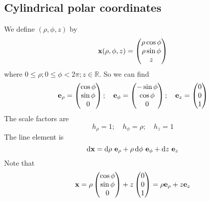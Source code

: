 \subsection{Cylindrical polar coordinates}
We define \((\rho, \phi, z)\) by
\[
	\vb x(\rho, \phi, z) = \begin{pmatrix}
		\rho \cos \phi \\
		\rho \sin \phi \\
		z
	\end{pmatrix}
\]
where \(0 \leq \rho; 0 \leq \phi < 2 \pi; z \in \mathbb R\).
So we can find
\[
	\vb e_\rho = \begin{pmatrix}
		\cos \phi \\ \sin \phi \\ 0
	\end{pmatrix};\quad \vb e_\phi = \begin{pmatrix}
		-\sin \phi \\ \cos \phi \\ 0
	\end{pmatrix};\quad \vb e_z = \begin{pmatrix}
		0 \\ 0 \\ 1
	\end{pmatrix}
\]
The scale factors are
\[
	h_\rho = 1;\quad h_\phi = \rho;\quad h_z = 1
\]
The line element is
\[
	\dd \vb x = \dd{\rho} \, \vb e_\rho + \rho \dd{\phi} \, \vb e_\phi + \dd{z} \, \vb e_z
\]
Note that
\[
	\vb x = \rho \begin{pmatrix}
		\cos \phi \\ \sin \phi \\ 0
	\end{pmatrix} + z \begin{pmatrix}
		0 \\ 0 \\ 1
	\end{pmatrix} = \rho \vb e_\rho + z \vb e_z
\]

